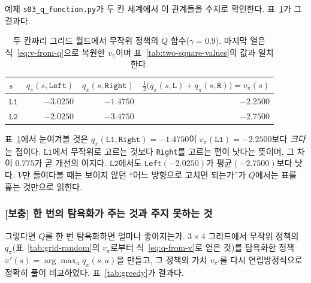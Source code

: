 \documentclass[11pt,a4paper]{article}
\newcommand{\Lone}{\texttt{L1}}
\newcommand{\Ltwo}{\texttt{L2}}
\begin{document}
예제 \texttt{s03\_q\_function.py}가 두 칸 세계에서 이 관계들을 수치로 확인한다.
표~\ref{tab:q-values}가 그 결과다.

\begin{table}[htbp]
\centering
\caption{두 칸짜리 그리드 월드에서 무작위 정책의 $Q$ 함수($\gamma=0.9$). 마지막 열은
식~\eqref{eq:v-from-q}으로 복원한 $v_\pi$이며 표~\ref{tab:two-square-values}의 값과 일치한다.}
\label{tab:q-values}
\small
\begin{tabular}{@{}lrrr@{}}
\toprule
$s$ & $q_\pi(s,\texttt{Left})$ & $q_\pi(s,\texttt{Right})$ & $\tfrac12\bigl(q_\pi(s,\texttt{L})+q_\pi(s,\texttt{R})\bigr) = v_\pi(s)$ \\
\midrule
$\Lone$ & $-3.0250$ & $-1.4750$ & $-2.2500$ \\
$\Ltwo$ & $-2.0250$ & $-3.4750$ & $-2.7500$ \\
\bottomrule
\end{tabular}
\end{table}

표~\ref{tab:q-values}에서 눈여겨볼 것은 $q_\pi(\Lone,\texttt{Right})=-1.4750$이 $v_\pi(\Lone)=-2.2500$보다
\emph{크다}는 점이다. $\Lone$에서 무작위로 고르는 것보다 \texttt{Right}를 고르는 편이 낫다는 뜻이며,
그 차이 $0.775$가 곧 개선의 여지다. $\Ltwo$에서도 \texttt{Left}$(-2.0250)$가 평균$(-2.7500)$보다 낫다.
$V$만 들여다볼 때는 보이지 않던 ``어느 방향으로 고치면 되는가''가 $Q$에서는 표를 훑는 것만으로 읽힌다.

\subsubsection{[보충] 한 번의 탐욕화가 주는 것과 주지 못하는 것}

그렇다면 $Q$를 한 번 탐욕화하면 얼마나 좋아지는가. $3\times4$ 그리드에서 무작위 정책의
$q_\pi$(표~\ref{tab:grid-random}의 $v_\pi$로부터 식~\eqref{eq:q-from-v}로 얻은 것)를 탐욕화한 정책
$\pi'(s)=\arg\max_a q_\pi(s,a)$을 만들고, 그 정책의 가치 $v_{\pi'}$를 다시 연립방정식으로 정확히 풀어
비교하였다. 표~\ref{tab:greedy}가 결과다.
\end{document}
